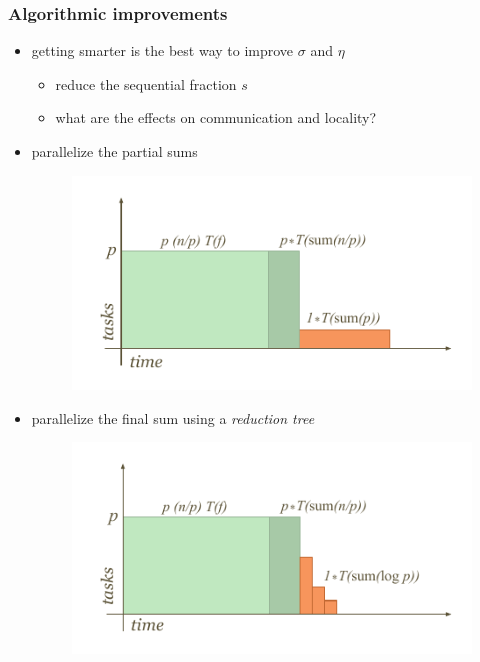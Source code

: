 \begin{frame}[fragile]
%
  \frametitle{Algorithmic improvements}
%
  \begin{itemize}
%
  \item getting smarter is the best way to improve $\sigma$ and $\eta$
    \begin{itemize}
      \item reduce the sequential fraction $s$
      \item what are the effects on communication and locality?
    \end{itemize}
%
  \item parallelize the partial sums
    \begin{figure}
      \centering
      \includegraphics[scale=0.70]{figures/reduction-partial-sum.pdf}
    \end{figure}
%
  \item parallelize the final sum using a {\em reduction tree}
    \begin{figure}
      \centering
      \includegraphics[scale=0.70]{figures/reduction-tree-sum.pdf}
    \end{figure}
%
  \end{itemize}
%
\end{frame}

